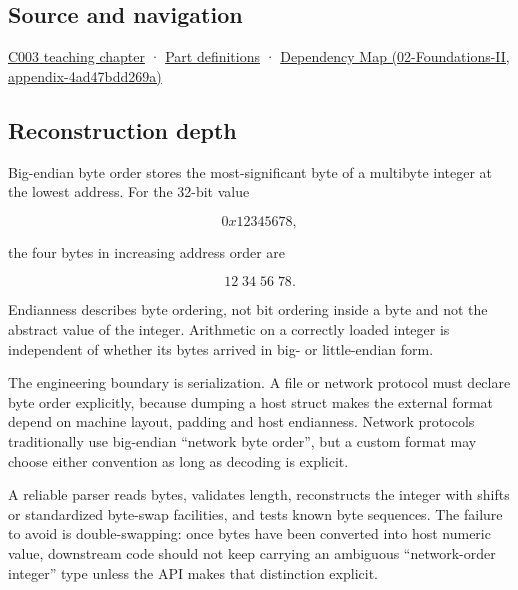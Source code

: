 \subsection{Source and navigation}\label{source-and-navigation}

\href{Continuous\%20Notes/Computing\%20Foundations\%20-\%20From\%20Bits\%20to\%20C++\%20and\%20Systems\%20APIs\#Where\%20the\%20bytes\%20live}{C003 teaching chapter} · \hyperref[appendix-fd090d982a15]{Part definitions} · \href{}{Dependency Map (02-Foundations-II, appendix-4ad47bdd269a)}

\subsection{Reconstruction depth}\label{reconstruction-depth}

Big-endian byte order stores the most-significant byte of a multibyte integer at the lowest address. For the 32-bit value

\[
0x12345678,
\]

the four bytes in increasing address order are

\[
12\;34\;56\;78.
\]

Endianness describes byte ordering, not bit ordering inside a byte and not the abstract value of the integer. Arithmetic on a correctly loaded integer is independent of whether its bytes arrived in big- or little-endian form.

The engineering boundary is serialization. A file or network protocol must declare byte order explicitly, because dumping a host struct makes the external format depend on machine layout, padding and host endianness. Network protocols traditionally use big-endian ``network byte order'', but a custom format may choose either convention as long as decoding is explicit.

A reliable parser reads bytes, validates length, reconstructs the integer with shifts or standardized byte-swap facilities, and tests known byte sequences. The failure to avoid is double-swapping: once bytes have been converted into host numeric value, downstream code should not keep carrying an ambiguous ``network-order integer'' type unless the API makes that distinction explicit.
